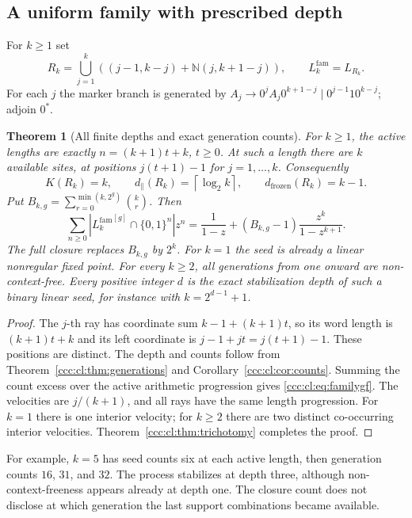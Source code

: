 \documentclass[11pt,letterpaper]{article}
\newtheorem{theorem}{Theorem}[section]
\theoremstyle{definition}
\theoremstyle{remark}
\newcommand{\N}{\mathbb N}
\newcommand{\gen}[2]{#1^{[#2]}}
\newcommand{\clog}[1]{\left\lceil\log_2 #1\right\rceil}
\begin{document}
\subsection{A uniform family with prescribed depth}

For $k\ge1$ set
\begin{equation}\label{ccc:cl:eq:kfamily}
 R_k=\bigcup_{j=1}^k
 \left((j-1,k-j)+\N(j,k+1-j)\right),\qquad L^{\mathrm{fam}}_k=L_{R_k}.
\end{equation}
For each $j$ the marker branch is generated by
$A_j\to0^j A_j0^{k+1-j}\mid0^{j-1}1 0^{k-j}$; adjoin $0^*$.

\begin{theorem}[All finite depths and exact generation counts]
\label{ccc:cl:thm:family}
For $k\ge1$, the active lengths are exactly
$n=(k+1)t+k$, $t\ge0$. At such a length there are $k$ available sites,
at positions $j(t+1)-1$ for $j=1,\ldots,k$.
Consequently
\[
 K(R_k)=k,\qquad d_{\parallel}(R_k)=\clog{k},\qquad
 d_{\mathrm{frozen}}(R_k)=k-1.
\]
Put $B_{k,g}=\sum_{r=0}^{\min(k,2^g)}\binom kr$. Then
\begin{equation}\label{ccc:cl:eq:familygf}
 \sum_{n\ge0}|\gen{{L^{\mathrm{fam}}_k}}g\cap\{0,1\}^n|z^n
 =\frac1{1-z}+(B_{k,g}-1)\frac{z^k}{1-z^{k+1}}.
\end{equation}
The full closure replaces $B_{k,g}$ by $2^k$.
For $k=1$ the seed is already a linear nonregular fixed point.
For every $k\ge2$, all generations from one onward are non-context-free.
Every positive integer $d$ is the exact stabilization depth of such a
binary linear seed, for instance with $k=2^{d-1}+1$.
\end{theorem}
\begin{proof}
The $j$-th ray has coordinate sum $k-1+(k+1)t$, so its word length is
$(k+1)t+k$ and its left coordinate is $j-1+jt=j(t+1)-1$.
These positions are distinct. The depth and counts follow from
Theorem~\ref{ccc:cl:thm:generations} and Corollary~\ref{ccc:cl:cor:counts}.
Summing the count excess over the active arithmetic progression gives
\eqref{ccc:cl:eq:familygf}.
The velocities are $j/(k+1)$, and all rays have the same length
progression. For $k=1$ there is one interior velocity; for $k\ge2$
there are two distinct co-occurring interior velocities.
Theorem~\ref{ccc:cl:thm:trichotomy} completes the proof.
\end{proof}

For example, $k=5$ has seed counts six at each active length, then
generation counts $16$, $31$, and $32$. The process stabilizes at depth
three, although non-context-freeness appears already at depth one.
The closure count does not disclose at which generation the last
support combinations became available.
\end{document}
